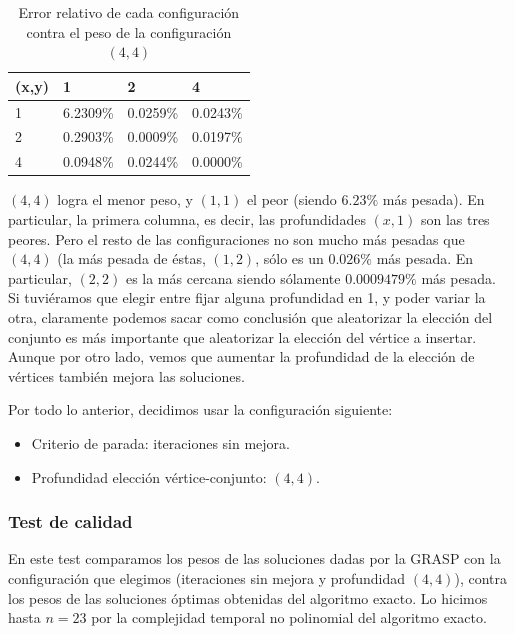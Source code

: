 \begin{table}[H]
    \begin{center}
        \begin{tabular}{ | l | l | l | l |}
        \hline
        (x,y)   & 1                 & 2                 & 4 \\ \hline
        1       & 6.2309\%         & 0.0259\%         & 0.0243\% \\ \hline
        2       & 0.2903\%         & 0.0009\%         & 0.0197\% \\ \hline
        4       & 0.0948\%         & 0.0244\%         & 0.0000\% \\
        \hline
        \end{tabular}
        \caption{Error relativo de cada configuración contra el peso de la configuración $(4,4)$}
    \end{center}
\end{table}
$(4,4)$ logra el menor peso, y $(1,1)$ el peor (siendo $6.23\%$ más pesada). En particular, la primera columna, es decir, las profundidades $(x,1)$ son las tres peores. Pero el resto de las configuraciones no son mucho más pesadas que $(4,4)$ (la más pesada de éstas, $(1,2)$, sólo es un $0.026\%$ más pesada. En particular, $(2,2)$ es la más cercana siendo sólamente $0.0009479\%$ más pesada. Si tuviéramos que elegir entre fijar alguna profundidad en 1, y poder variar la otra, claramente podemos sacar como conclusión que aleatorizar la elección del conjunto es más importante que aleatorizar la elección del vértice a insertar. Aunque por otro lado, vemos que aumentar la profundidad de la elección de vértices también mejora las soluciones.

\noindent Por todo lo anterior, decidimos usar la configuración siguiente:
\begin{itemize}
    \item Criterio de parada: iteraciones sin mejora.
    \item Profundidad elección vértice-conjunto: $(4,4)$.
\end{itemize}

\subsubsection{Test de calidad}

En este test comparamos los pesos de las soluciones dadas por la GRASP con la configuración que elegimos (iteraciones sin mejora y profundidad $(4,4)$), contra los pesos de las soluciones óptimas obtenidas del algoritmo exacto. Lo hicimos hasta $n = 23$ por la complejidad temporal no polinomial del algoritmo exacto. 

